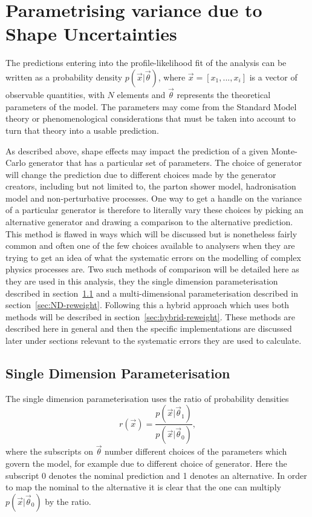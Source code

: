 \section{Parametrising variance due to Shape Uncertainties}
\label{sec:re-weighting}

The predictions entering into the profile-likelihood fit of the analysis can be
written as a probability density $p(\vec{x}|\vec{\theta})$, where $\vec{x} =
[x_{1},..., x_{i}]$ is a vector of observable quantities, with $N$ elements and
$\vec{\theta}$ represents the theoretical parameters of the model. The
parameters may come from the Standard Model theory or phenomenological
considerations that must be taken into account to turn that theory into a usable
prediction.

As described above, shape effects may impact the prediction of a given
Monte-Carlo generator that has a particular set of parameters. The choice of
generator will change the prediction due to different choices made by the
generator creators, including but not limited to, the parton shower model,
hadronisation model and non-perturbative processes. One way to get a handle on
the variance of a particular generator is therefore to literally vary these
choices by picking an alternative generator and drawing a comparison to the
alternative prediction. This method is flawed in ways which will be discussed
but is nonetheless fairly common and often one of the few choices available to
analysers when they are trying to get an idea of what the systematic errors on
the modelling of complex physics processes are. Two such methods of comparison
will be detailed here as they are used in this analysis, they the single
dimension parameterisation described in section~\ref{sec:1D-reweight} and a
multi-dimensional parameterisation described in section~\ref{sec:ND-reweight}.
Following this a hybrid approach which uses both methods will be described in
section~\ref{sec:hybrid-reweight}. These methods are described here in general
and then the specific implementations are discussed later under sections
relevant to the systematic errors they are used to calculate.

\subsection{Single Dimension Parameterisation}
\label{sec:1D-reweight}

The single dimension parameterisation uses the ratio of probability densities
\begin{equation}
  r(\vec{x}) = \frac{p(\vec{x}|\vec{\theta}_{1})}{p(\vec{x}|\vec{\theta}_{0})},
  \label{eq:DensityRatio}
\end{equation}
where the subscripts on $\vec{\theta}$ number different choices of the
parameters which govern the model, for example due to different choice of
generator. Here the subscript 0 denotes the nominal prediction and 1 denotes an
alternative. In order to map the nominal to the alternative it is clear that the
one can multiply $p(\vec{x}|\vec{\theta}_{0})$ by the ratio.


